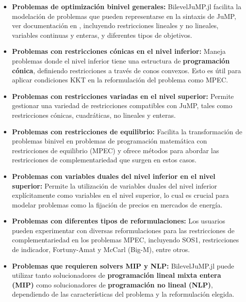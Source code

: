 \begin{itemize}
    \item \textbf{Problemas de optimización binivel generales:} BilevelJuMP.jl facilita la modelación de problemas que pueden representarse en la sintaxis de JuMP, ver documentación en \cite{JuMPPaper}, incluyendo restricciones lineales y no lineales, variables continuas y enteras, y diferentes tipos de objetivos.
    
    \item \textbf{Problemas con restricciones cónicas en el nivel inferior:} Maneja problemas donde el nivel inferior tiene una estructura de \textbf{programación cónica}, definiendo restricciones a través de conos convexos. Esto es útil para aplicar condiciones KKT en la reformulación del problema como MPEC.
    
    \item \textbf{Problemas con restricciones variadas en el nivel superior:} Permite gestionar una variedad de restricciones compatibles con JuMP, tales como restricciones cónicas, cuadráticas, no lineales y enteras.
    
    \item \textbf{Problemas con restricciones de equilibrio:} Facilita la transformación de problemas binivel en problemas de programación matemática con restricciones de equilibrio (MPEC) y ofrece métodos para abordar las restricciones de complementariedad que surgen en estos casos.
    
    \item \textbf{Problemas con variables duales del nivel inferior en el nivel superior:} Permite la utilización de variables duales del nivel inferior explícitamente como variables en el nivel superior, lo cual es crucial para modelar problemas como la fijación de precios en mercados de energía.
    
    \item \textbf{Problemas con diferentes tipos de reformulaciones:} Los usuarios pueden experimentar con diversas reformulaciones para las restricciones de complementariedad en los problemas MPEC, incluyendo SOS1, restricciones de indicador, Fortuny-Amat y McCarl (Big-M), entre otros.
    
    \item \textbf{Problemas que requieren solvers MIP y NLP:} BilevelJuMP.jl puede utilizar tanto solucionadores de \textbf{programación lineal mixta entera (MIP)} como solucionadores de \textbf{programación no lineal (NLP)}, dependiendo de las características del problema y la reformulación elegida.
\end{itemize}

